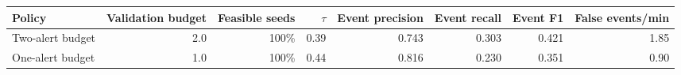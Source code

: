 \begin{tabular}{lrrrrrrr}
\toprule
Policy & Validation budget & Feasible seeds & $\tau$ & Event precision & Event recall & Event F1 & False events/min \\
\midrule
Two-alert budget & 2.0 & 100\% & 0.39 & 0.743 & 0.303 & 0.421 & 1.85 \\
One-alert budget & 1.0 & 100\% & 0.44 & 0.816 & 0.230 & 0.351 & 0.90 \\
\bottomrule
\end{tabular}
